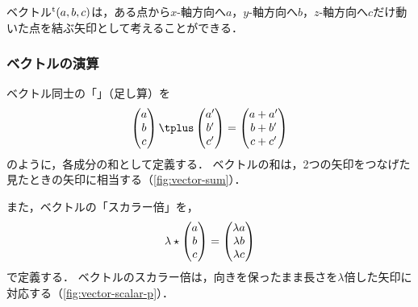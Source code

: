 \documentclass[../sotsu.tex]{subfiles}
\begin{document}
ベクトル${}^{\mathrm{t}}(a, b, c)$は，ある点から$x$-軸方向へ$a$，$y$-軸方向へ$b$，$z$-軸方向へ$c$だけ動いた点を結ぶ矢印として考えることができる．


\subsubsection*{ベクトルの演算}

ベクトル同士の「」（足し算）を
\begin{equation*}
    \begin{pmatrix}
        a  \\  b  \\  c
    \end{pmatrix}
    \vecplus
    \begin{pmatrix}
        a' \\ b' \\ c'
    \end{pmatrix}
    =
    \begin{pmatrix}
        a + a'  \\  b + b'  \\  c + c'
    \end{pmatrix}
\end{equation*}
のように，各成分の和として定義する．
ベクトルの和は，2つの矢印をつなげた見たときの矢印に相当する（\cref{fig:vector-sum}）．

また，ベクトルの「スカラー倍」を，
\begin{equation*}
    \lambda \mathbin{\star} 
    \begin{pmatrix}
        a  \\  b  \\  c
    \end{pmatrix}
    =
    \begin{pmatrix}
        \lambda a  \\  \lambda b  \\  \lambda c
    \end{pmatrix}
\end{equation*}
で定義する．
ベクトルのスカラー倍は，向きを保ったまま長さを$\lambda$倍した矢印に対応する（\cref{fig:vector-scalar-p}）．
\end{document}
